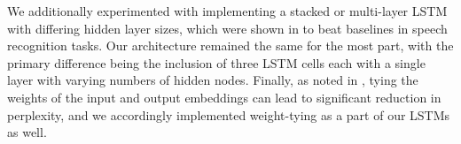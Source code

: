 \documentclass[11pt]{article}
\begin{document}
We additionally experimented with implementing a stacked or multi-layer LSTM with differing hidden layer sizes, which were shown in \cite{DBLP:journals/corr/abs-1303-5778} to beat baselines in speech recognition tasks. Our architecture remained the same for the most part, with the primary difference being the inclusion of three LSTM cells each with a single layer with varying numbers of hidden nodes. Finally, as noted in \cite{DBLP:journals/corr/PressW16}, tying the weights of the input and output embeddings can lead to significant reduction in perplexity, and we accordingly implemented weight-tying as a part of our LSTMs as well.






\end{document}
